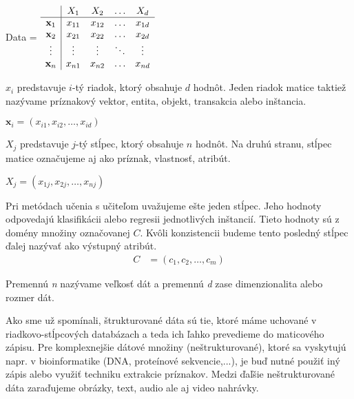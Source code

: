 \begin{center}
Data = 
$\begin{array}{c | c c c c}
& X_{1} & X_{2} & \ldots & X_{d} \\ \hline
\mathbf{x}_{1} & x_{11} & x_{12} & \ldots & x_{1d} \\
\mathbf{x}_{2} & x_{21} & x_{22} & \ldots & x_{2d} \\
\vdots & \vdots & \vdots & \ddots & \vdots \\
\mathbf{x}_{n} & x_{n1} & x_{n2} & \ldots & x_{nd} \\
\end{array}$
\end{center}

$x_{i}$ predstavuje $i$-tý riadok, ktorý obsahuje $d$ hodnôt.
Jeden riadok matice taktiež nazývame príznakový vektor, entita, objekt, transakcia alebo inštancia.
\begin{center}
$\mathbf{x}_{i} = (x_{i1},x_{i2},\ldots,x_{id})$
\end{center}

$X_{j}$ predstavuje $j$-tý stĺpec, ktorý obsahuje $n$ hodnôt.
Na druhú stranu, stĺpec matice označujeme aj ako príznak, vlastnosť, atribút.
\begin{center}
$X_{j} = (x_{1j},x_{2j},\ldots,x_{nj})$
\end{center}

Pri metódach učenia s učiteľom uvažujeme ešte jeden stĺpec. Jeho hodnoty odpovedajú klasifikácii alebo regresii jednotlivých inštancií. Tieto hodnoty sú z domény množiny označovanej $C$. Kvôli konzistencii budeme tento posledný stĺpec ďalej nazývať ako výstupný atribút.
\begin{align}
C &= (c_{1},c_{2},\ldots,c_{m}) \nonumber
\end{align}

Premennú \textit{n} nazývame veľkosť dát a premennú \textit{d} zase dimenzionalita alebo rozmer dát.

Ako sme už spomínali, štrukturované dáta sú tie, ktoré máme uchované v riadkovo-stĺpcových databázach a teda ich ľahko prevedieme do maticového zápisu. Pre komplexnejšie dátové množiny (neštrukturované), ktoré sa vyskytujú napr. v bioinformatike (DNA, proteínové sekvencie,...), je buď nutné použiť iný zápis alebo využiť techniku extrakcie príznakov. Medzi ďaľšie neštrukturované dáta zaraďujeme obrázky, text, audio ale aj video nahrávky.

